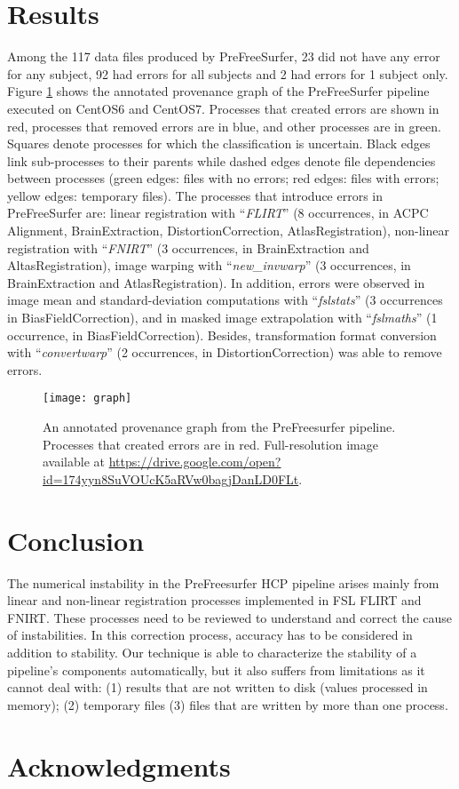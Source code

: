 \documentclass{article}
\begin{document}
\section{Results}

Among the 117 data files produced by PreFreeSurfer, 23 did not have any error for any subject, 92 had errors 
for all subjects and 2 had errors for 1 subject only. 
Figure \ref{fig:2} shows the annotated provenance graph of the PreFreeSurfer pipeline executed on CentOS6 and CentOS7. 
Processes that created errors are shown in red, processes that removed errors are in blue, and other processes are in green. 
Squares denote processes for which the classification is uncertain. Black edges link sub-processes to their parents while 
dashed edges denote file dependencies between processes (green edges: files with no errors; red edges: files with errors; yellow edges: temporary files).  
The processes that introduce errors in PreFreeSurfer are: linear registration with “\emph{FLIRT}” 
(8 occurrences, in ACPC Alignment, BrainExtraction, DistortionCorrection, AtlasRegistration), 
non-linear registration with “\emph{FNIRT}” (3 occurrences, in BrainExtraction and AltasRegistration), 
image warping with “\emph{new_invwarp}” (3 occurrences, in BrainExtraction and AtlasRegistration). 
In addition, errors were observed in image mean and standard-deviation computations with “\emph{fslstats}” (3 occurrences in BiasFieldCorrection), 
and in masked image extrapolation with “\emph{fslmaths}” (1 occurrence, in BiasFieldCorrection). 
Besides, transformation format conversion with “\emph{convertwarp}” (2 occurrences, in DistortionCorrection) was able to remove errors. 

\begin{figure}
  \texttt{[image: graph]}
  \caption{An annotated provenance graph from the PreFreesurfer pipeline. Processes that created errors are in red. 
Full-resolution image available at \url{https://drive.google.com/open?id=174yyn8SuVOUcK5aRVw0bagjDanLD0FLt}.}
  \label{fig:2}
\end{figure}

\section{Conclusion}

The numerical instability in the PreFreesurfer HCP pipeline arises mainly from linear and non-linear registration processes 
implemented in FSL FLIRT and FNIRT. These processes need to be reviewed to understand and correct the cause of instabilities. 
In this correction process, accuracy has to be considered in addition to stability. Our technique is able to 
characterize the stability of a pipeline’s components automatically, but it also suffers from limitations as it cannot deal with: 
(1) results that are not written to disk (values processed in memory); (2) temporary files (3) files that are written by more than one process.


\section{Acknowledgments}





\end{document}
